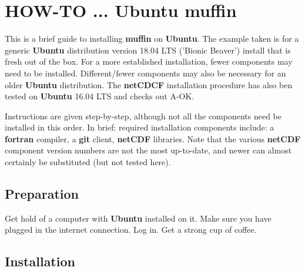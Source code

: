 \documentclass[11pt,fleqn]{book} %
\begin{document}

\newpage


\section{HOW-TO ... Ubuntu muffin}\label{how-to-ubuntu}
\vspace{2mm}


This is a brief guide to installing \textbf{muffin} on \textbf{Ubuntu}. The example taken is for a generic \textbf{Ubuntu} distribution version 18.04 LTS ('Bionic Beaver') install that is fresh out of the box. For a more established installation, fewer components may need to be installed. Different/fewer components may also be necessary for an older \textbf{Ubuntu} distribution.
The \textbf{netCDCF} installation procedure has also ben tested on \textbf{Ubuntu} 16.04 LTS and checks out A-OK.

Instructions are given step-by-step, although not all the components need be installed in this order. In brief: required installation components include: a \textbf{fortran} compiler, a \textbf{git} client, \textbf{netCDF} libraries.
Note that the various \textbf{netCDF} component version numbers are not the most up-to-date, and newer can almost certainly be substituted (but not tested here).
%
\subsection*{Preparation}

Get hold of a computer with \textbf{Ubuntu} installed on it. Make sure you have plugged in the internet connection. Log in. Get a strong cup of coffee.

%
\subsection*{Installation}
\end{document}
